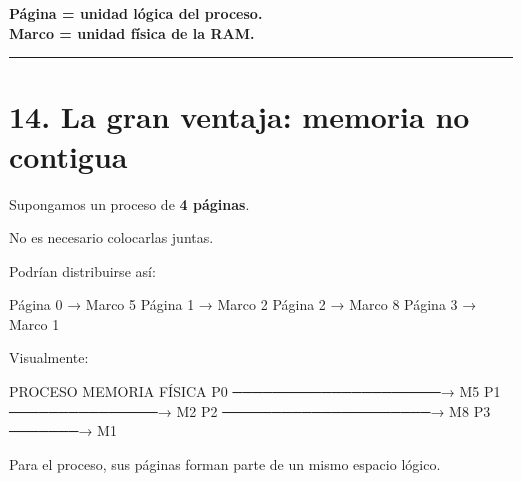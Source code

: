\documentclass[
  spanish,
  letterpaper,
]{scrbook}
\newenvironment{Shaded}{\begin{snugshade}}{\end{snugshade}}
\newcommand{\NormalTok}[1]{\textcolor[rgb]{0.00,0.23,0.31}{#1}}
\begin{document}
\begin{tcolorbox}[enhanced jigsaw, arc=.35mm, bottomrule=.15mm, bottomtitle=1mm, breakable, colback=white, colbacktitle=quarto-callout-tip-color!10!white, colframe=quarto-callout-tip-color-frame, coltitle=black, left=2mm, leftrule=.75mm, opacityback=0, opacitybacktitle=0.6, rightrule=.15mm, title=\textcolor{quarto-callout-tip-color}{\faLightbulb}\hspace{0.5em}{Dos palabras fundamentales}, titlerule=0mm, toprule=.15mm, toptitle=1mm]

\textbf{Página = unidad lógica del proceso.}\\
\textbf{Marco = unidad física de la RAM.}

\end{tcolorbox}

\begin{center}\rule{0.5\linewidth}{0.5pt}\end{center}


\chapter{14. La gran ventaja: memoria no
contigua}\label{la-gran-ventaja-memoria-no-contigua}

Supongamos un proceso de \textbf{4 páginas}.

No es necesario colocarlas juntas.

Podrían distribuirse así:

\begin{Shaded}
\begin{Highlighting}[]
\NormalTok{Página 0 → Marco 5}
\NormalTok{Página 1 → Marco 2}
\NormalTok{Página 2 → Marco 8}
\NormalTok{Página 3 → Marco 1}
\end{Highlighting}
\end{Shaded}

Visualmente:

\begin{Shaded}
\begin{Highlighting}[]
\NormalTok{PROCESO                    MEMORIA FÍSICA}
\NormalTok{P0 ─────────────────────→ M5}
\NormalTok{P1 ───────────────→       M2}
\NormalTok{P2 ─────────────────────→ M8}
\NormalTok{P3 ───────→               M1}
\end{Highlighting}
\end{Shaded}

Para el proceso, sus páginas forman parte de un mismo espacio lógico.
\end{document}

